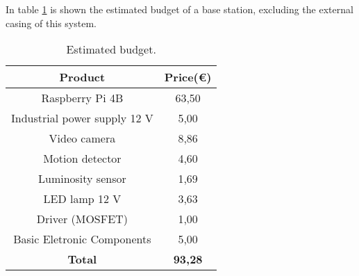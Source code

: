 In table \ref{table:data} is shown the estimated budget of a base station, excluding the external casing of this system.

\begin{table}[ht]
	\centering
	
	\begin{tabular}{||c | c||} 
		\hline
		\textbf{Product} & \textbf{Price(€)}\\
		\hline\hline
		Raspberry Pi 4B & 63,50\\\hline
		Industrial power supply 12 V & 5,00\\\hline
		Video camera & 8,86\\\hline
		Motion detector & 4,60\\\hline
		Luminosity sensor & 1,69\\\hline
		LED lamp 12 V & 3,63\\\hline
		Driver (MOSFET) & 1,00\\\hline
		Basic Eletronic Components & 5,00\\\hline
		\hline
		\textbf{Total} & \textbf{93,28}\\\hline
	\end{tabular}
	\caption{Estimated budget.}
	\label{table:data}
\end{table}